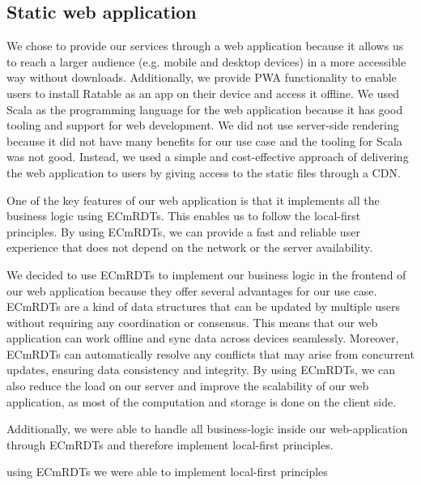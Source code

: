 \documentclass[
	ngerman,
	ruledheaders=section,   %
	class=report,		    %
	thesis={type=bachelor}, %
	accentcolor=9c,			%
	custommargins=true,    %
	marginpar=false,        %
	parskip=half-,          %
	fontsize=11pt,          %
]{tudapub}
\begin{document}
\subsection{Static web application}
We chose to provide our services through a web application because it allows us to reach a larger audience (e.g. mobile and desktop devices) in a more accessible way without downloads. Additionally, we provide PWA functionality to enable users to install Ratable as an app on their device and access it offline. We used Scala as the programming language for the web application because it has good tooling and support for web development. We did not use server-side rendering because it did not have many benefits for our use case and the tooling for Scala was not good. Instead, we used a simple and cost-effective approach of delivering the web application to users by giving access to the static files through a CDN.

One of the key features of our web application is that it implements all the business logic using ECmRDTs. This enables us to follow the local-first principles. By using ECmRDTs, we can provide a fast and reliable user experience that does not depend on the network or the server availability.

We decided to use ECmRDTs to implement our business logic in the frontend of our web application because they offer several advantages for our use case. ECmRDTs are a kind of data structures that can be updated by multiple users without requiring any coordination or consensus. This means that our web application can work offline and sync data across devices seamlessly. Moreover, ECmRDTs can automatically resolve any conflicts that may arise from concurrent updates, ensuring data consistency and integrity. By using ECmRDTs, we can also reduce the load on our server and improve the scalability of our web application, as most of the computation and storage is done on the client side.

Additionally, we were able to handle all business-logic inside our web-application through ECmRDTs and therefore implement local-first principles.

using ECmRDTs we were able to implement local-first principles 
\end{document}
